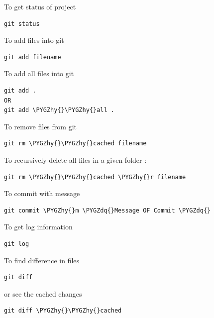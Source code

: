 \documentclass[letterpaper,10pt,english]{sphinxmanual}
\def\PYGZhy{\char`\-}
\def\PYGZdq{\char`\"}
\begin{document}
To get status of project

\begin{Verbatim}[commandchars=\\\{\}]
git status
\end{Verbatim}

To add files into git

\begin{Verbatim}[commandchars=\\\{\}]
git add filename
\end{Verbatim}

To add all files into git

\begin{Verbatim}[commandchars=\\\{\}]
git add .
OR
git add \PYGZhy{}\PYGZhy{}all .
\end{Verbatim}

To remove files from git

\begin{Verbatim}[commandchars=\\\{\}]
git rm \PYGZhy{}\PYGZhy{}cached filename
\end{Verbatim}

To recursively delete all files in a given folder :

\begin{Verbatim}[commandchars=\\\{\}]
git rm \PYGZhy{}\PYGZhy{}cached \PYGZhy{}r filename
\end{Verbatim}

To commit with message

\begin{Verbatim}[commandchars=\\\{\}]
git commit \PYGZhy{}m \PYGZdq{}Message OF Commit \PYGZdq{}
\end{Verbatim}

To get log information

\begin{Verbatim}[commandchars=\\\{\}]
git log
\end{Verbatim}

To find difference in files

\begin{Verbatim}[commandchars=\\\{\}]
git diff
\end{Verbatim}

or see the cached changes

\begin{Verbatim}[commandchars=\\\{\}]
git diff \PYGZhy{}\PYGZhy{}cached
\end{Verbatim}
\end{document}
